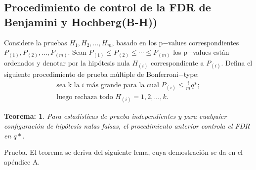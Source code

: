 \documentclass[11pt,letterpaper]{article}
\newtheorem{thmt}{Teorema:}
\begin{document}
\subsection{Procedimiento de control de la FDR de Benjamini y Hochberg(B-H))}
Considere la pruebas $H_1, H_2, ..., H_m$, basado en los p$-$values correspondientes $P_{(1)}, P_{(2)},..., P_{(m)}$. Sean $P_{(1)}\leq P_{(2)}\leq \cdots \leq  P_{(m)}$ los p$-$values están ordenados y denotar por la hipótesis nula $H_{(i)}$ correspondiente a $P_{(i)}$. Defina el siguiente procedimiento de prueba múltiple de Bonferroni$-$type:\\
\begin{align}
 \text{sea k la $i$ más grande para la cual }P_{(i)}\leq \frac{i}{m}q*;\\
 \text{luego rechaza todo }H_{(i)} = 1, 2, ..., k.
\end{align} 

\begin{framed}
    \begin{thmt} \label{t_1}
Para estadísticas de prueba independientes y para cualquier configuración de hipótesis nulas falsas, el procedimiento anterior controla el FDR en $q*$.
    \end{thmt}
\end{framed}
Prueba. El teorema se deriva del siguiente lema, cuya demostración se da en el apéndice A.
\end{document}
